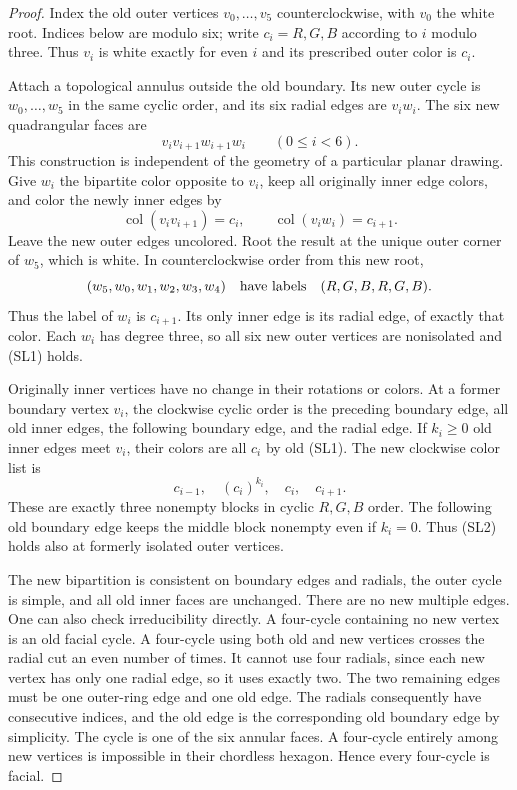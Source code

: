 \documentclass[11pt,letterpaper]{article}
\numberwithin{equation}{section}
\theoremstyle{remark}\newtheorem{remark}[theorem]{Remark}
\begin{document}
\begin{proof}
Index the old outer vertices $v_0,\ldots,v_5$ counterclockwise, with
$v_0$ the white root. Indices below are modulo six; write
$c_i=R,G,B$ according to $i$ modulo three. Thus $v_i$ is white
exactly for even $i$ and its prescribed outer color is $c_i$.

Attach a topological annulus outside the old boundary. Its new
outer cycle is $w_0,\ldots,w_5$ in the same cyclic order, and its
six radial edges are $v_iw_i$. The six new quadrangular faces are
\[
 v_i v_{i+1}w_{i+1}w_i\qquad(0\le i<6).
\]
This construction is independent of the geometry of a particular
planar drawing. Give $w_i$ the bipartite color opposite to $v_i$,
keep all originally inner edge colors, and color the newly inner
edges by
\begin{equation}\label{cps:log:eq:sleevecolors}
 \operatorname{col}(v_iv_{i+1})=c_i,\qquad
 \operatorname{col}(v_iw_i)=c_{i+1}.
\end{equation}
Leave the new outer edges uncolored. Root the result at the unique
outer corner of $w_5$, which is white. In counterclockwise order
from this new root,
\[
 (w_5,w_0,w_1,w_2,w_3,w_4)\quad\hbox{have labels}\quad(R,G,B,R,G,B).
\]
Thus the label of $w_i$ is $c_{i+1}$. Its only inner edge is its
radial edge, of exactly that color. Each $w_i$ has degree three, so
all six new outer vertices are nonisolated and (SL1) holds.

Originally inner vertices have no change in their rotations or
colors. At a former boundary vertex $v_i$, the clockwise cyclic
order is the preceding boundary edge, all old inner edges, the
following boundary edge, and the radial edge. If $k_i\ge0$ old
inner edges meet $v_i$, their colors are all $c_i$ by old (SL1).
The new clockwise color list is
\[
 c_{i-1},\quad(c_i)^{k_i},\quad c_i,\quad c_{i+1}.
\]
These are exactly three nonempty blocks in cyclic $R,G,B$ order.
The following old boundary edge keeps the middle block nonempty
even if $k_i=0$. Thus (SL2) holds also at formerly isolated outer
vertices.

The new bipartition is consistent on boundary edges and radials,
the outer cycle is simple, and all old inner faces are unchanged.
There are no new multiple edges. One can also check irreducibility
directly. A four-cycle containing no new vertex is an old facial
cycle. A four-cycle using both old and new vertices crosses the
radial cut an even number of times. It cannot use four radials,
since each new vertex has only one radial edge, so it uses exactly
two. The two remaining edges must be one outer-ring edge and one
old edge. The radials consequently have consecutive indices, and
the old edge is the corresponding old boundary edge by simplicity.
The cycle is one of the six annular faces. A four-cycle entirely
among new vertices is impossible in their chordless hexagon.
Hence every four-cycle is facial.


\end{proof}
\end{document}
